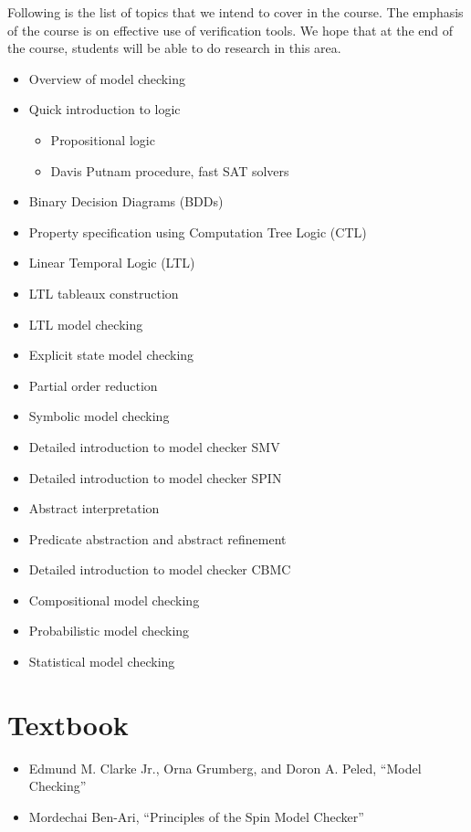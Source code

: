 \documentclass{article}
\begin{document}
Following is the list of topics that we intend to cover in the
course. The emphasis of the course is on effective use of verification
tools. We hope that at the end of the course, students will be able to
do research in this area.
\begin{itemize}
\item Overview of model checking
\item Quick introduction to logic
  \begin{itemize}
  \item Propositional logic
  \item Davis Putnam procedure, fast SAT solvers
  \end{itemize}
\item Binary Decision Diagrams (BDDs)
\item Property specification using Computation Tree Logic (CTL)
\item Linear Temporal Logic (LTL)
\item LTL tableaux construction
\item LTL model checking
\item Explicit state model checking
\item Partial order reduction
\item Symbolic model checking
\item Detailed introduction to model checker SMV
\item Detailed introduction to model checker SPIN
\item Abstract interpretation
\item Predicate abstraction and abstract refinement
\item Detailed introduction to model checker CBMC
\item Compositional model checking
\item Probabilistic model checking
\item Statistical model checking
\end{itemize}

\section{Textbook}
\begin{itemize}
\item Edmund M. Clarke Jr., Orna Grumberg, and Doron A. Peled, ``Model Checking''
\item Mordechai Ben-Ari, ``Principles of the Spin Model Checker''
\end{itemize}
\end{document}
